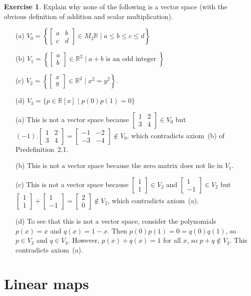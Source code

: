 \documentclass{amsart}
\newcommand{\R}         {{\mathbb{R}}}
\newcommand{\bsm}       {\left[\begin{smallmatrix}}
\newcommand{\esm}       {\end{smallmatrix}\right]}
\newcommand{\st}        {\;|\;}
\renewcommand{\:}       {\colon}
\theoremstyle{definition}
\newtheorem{exercise}{Exercise}[section]
\renewenvironment{solution}{\SolutionAtEnd}{\endSolutionAtEnd}
\begin{document}
\begin{exercise}
 Explain why none of the following is a vector space (with
 the obvious definition of addition and scalar
 multiplication). 
 \begin{itemize}
  \item[(a)] $V_0=\left\{\bsm a&b\\ c&d\esm\in M_2\R\st a\leq b\leq
    c\leq d\right\}$
  \item[(b)] $V_1=\left\{\bsm a\\ b\esm\in\R^2\st
                         a+b\text{ is an odd integer } \right\}$
  \item[(c)] $V_2=\left\{\bsm x\\ y\esm\in\R^2 \st x^2=y^2\right\}$.
  \item[(d)] $V_3=\{p\in\R[x]\st p(0)p(1)=0\}$
 \end{itemize}
\end{exercise}
\begin{solution}
 \begin{itemize}
 \item[(a)] This is not a vector space because
  $\bsm 1&2\\3&4\esm\in V_0$ but 
  $(-1).\bsm 1&2\\3&4\esm=\bsm -1&-2\\-3&-4\esm\not\in V_0$,
  which contradicts axiom~(b) of Predefinition~2.1.
 \item[(b)] This is not a vector space because the zero matrix does
  not lie in $V_1$.
 \item[(c)] This is not a vector space because
  $\bsm 1\\1\esm\in V_2$ and $\bsm 1\\-1\esm\in V_2$
  but $\bsm 1\\1\esm+\bsm 1\\-1\esm=\bsm 2\\0\esm\not\in V_2$,
  which contradicts axiom~(a).
 \item[(d)] To see that this is not a vector space, consider
  the polynomials $p(x)=x$ and $q(x)=1-x$.  Then
  $p(0)p(1)=0=q(0)q(1)$, so $p\in V_3$ and $q\in V_3$.
  However, $p(x)+q(x)=1$ for all $x$, so $p+q\not\in V_3$.
  This contradicts axiom~(a).
 \end{itemize}
\end{solution}

\section{Linear maps}
\label{sec-linear}
\end{document}
